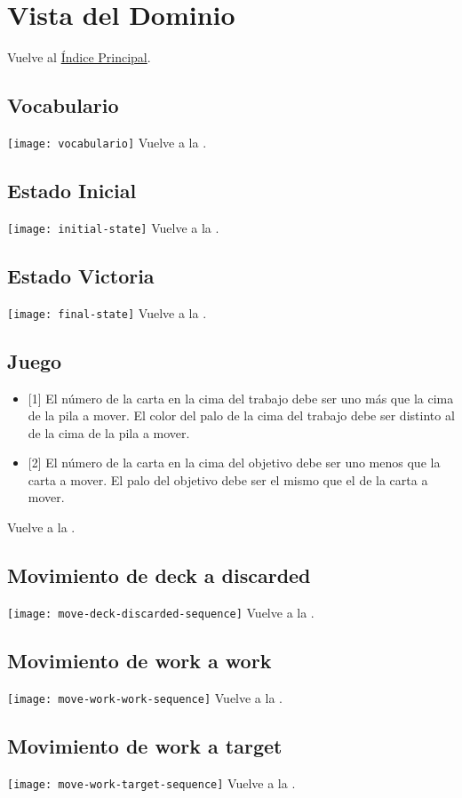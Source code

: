 \newpage{}
\section{Vista del Dominio}\label{domaintoc}

\secttoc
Vuelve al \hyperlink{toc}{Índice Principal}.

\newpage{}
\subsection{Vocabulario}
\texttt{[image: vocabulario]}
Vuelve a la .

\newpage{}
\subsection{Estado Inicial}
\texttt{[image: initial-state]}
Vuelve a la .

\newpage{}
\subsection{Estado Victoria}
\texttt{[image: final-state]}
Vuelve a la .

\begin{landscape}
\subsection{Juego}
\begin{center}
\end{center}
\begin{itemize}
    \item {[1]} El número de la carta en la cima del trabajo debe ser uno más que la cima de la pila a mover. El color del palo de la cima del trabajo debe ser distinto al de la cima de la pila a mover.
    \item {[2]} El número de la carta en la cima del objetivo debe ser uno menos que la carta a mover. El palo del objetivo debe ser el mismo que el de la carta a mover.
\end{itemize}
Vuelve a la .
\end{landscape}

\newpage{}
\subsection{Movimiento de deck a discarded}
\texttt{[image: move-deck-discarded-sequence]}
Vuelve a la .

\newpage{}
\subsection{Movimiento de work a work}
\texttt{[image: move-work-work-sequence]}
Vuelve a la .

\newpage{}
\subsection{Movimiento de work a target}
\texttt{[image: move-work-target-sequence]}
Vuelve a la .
